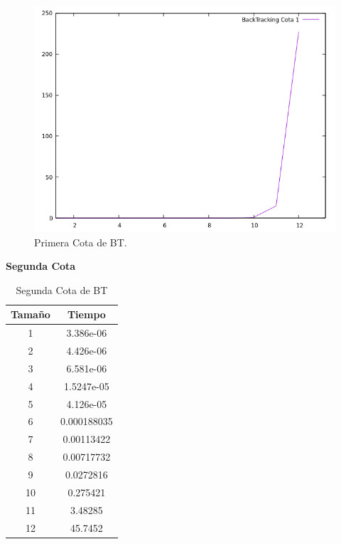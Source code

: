 \documentclass[a4paper,12pt,twoside]{article} %
\begin{document}
\newpage
\begin{figure}[h]
  \begin{center}
  
  	\includegraphics[scale=0.7]{IMAGENES/bt_c1.png}
  	\caption{Primera Cota de BT.}
  	
  \end{center}
\end{figure}

\newpage

\textbf{Segunda Cota}

\begin{table}[h]
    \begin{center}
	\begin{tabular}{|c|c|}
		\hline
		Tamaño & Tiempo \\
		\hline
            1 & 3.386e-06 \\
            2 & 4.426e-06 \\
            3 & 6.581e-06 \\
            4 & 1.5247e-05 \\
            5 & 4.126e-05 \\
            6 & 0.000188035 \\
            7 & 0.00113422 \\
            8 & 0.00717732 \\
            9 & 0.0272816 \\
            10 & 0.275421 \\
            11 & 3.48285 \\
            12 & 45.7452 \\
		\hline
	\end{tabular}
    \end{center}
    \caption{Segunda Cota de BT}
\end{table}
\newpage
\end{document}
